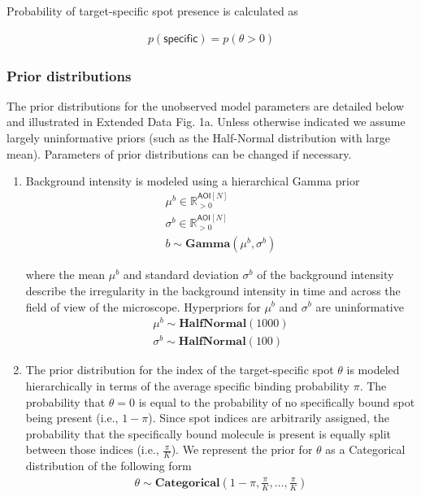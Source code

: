Probability of target-specific spot presence is calculated as

\begin{gather*}
    p(\mathsf{specific}) = p(\theta > 0)
\end{gather*}

\subsubsection*{Prior distributions}

The prior distributions for the unobserved model parameters are detailed below and illustrated in Extended Data Fig. 1a. Unless otherwise indicated we assume largely uninformative priors (such as the Half-Normal distribution with large mean). Parameters of prior distributions can be changed if necessary.
%
\begin{enumerate}
    \item Background intensity is modeled using a hierarchical Gamma prior
%
\begin{gather*}
    \mu^b \in \mathbb{R}_{>0}^{\mathsf{AOI}[N]} \\
    \sigma^b \in \mathbb{R}_{>0}^{\mathsf{AOI}[N]} \\
    b \sim \mathbf{Gamma}(\mu^b, \sigma^b)
\end{gather*}

\noindent
where the mean $\mu^b$ and standard deviation $\sigma^b$ of the background intensity describe the irregularity in the background intensity in time and across the field of view of the microscope. Hyperpriors for $\mu^b$ and $\sigma^b$ are uninformative
%
\begin{gather*}
    \mu^b \sim \mathbf{HalfNormal}(1000) \\
    \sigma^b \sim \mathbf{HalfNormal}(100)
\end{gather*}

\item The prior distribution for the index of the target-specific spot $\theta$ is modeled hierarchically in terms of the average specific binding probability $\pi$. The probability that $\theta = 0$ is equal to the probability of no specifically bound spot being present (i.e., $1-\pi$). Since spot indices are arbitrarily assigned, the probability that the specifically bound molecule is present is equally split between those indices (i.e., $\frac{\pi}{K}$). We represent the prior for $\theta$ as a Categorical distribution of the following form
%
\begin{gather*}
    \theta \sim \mathbf{Categorical}\left(1 - \pi, \frac{\pi}{K}, \dots, \frac{\pi}{K}\right)
\end{gather*}


\end{enumerate}
